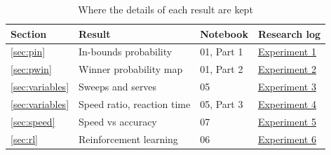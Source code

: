   \begin{table}[htbp]
    \centering
    \caption{Where the details of each result are kept}
    \label{tab:index}
    \begin{tabular}{llll}
      \toprule
      Section & Result & Notebook & Research log \\
      \midrule
      \ref{sec:pin} & In-bounds probability & 01, Part 1
        & \href{https://docs.google.com/document/d/19KGM-1a9U5E7CrE4ltljYz7IVtMfNuRzrqgGkkuXUSQ/edit?tab=t.0}{Experiment 1} \\
      \ref{sec:pwin} & Winner probability map & 01, Part 2
        & \href{https://docs.google.com/document/d/19KGM-1a9U5E7CrE4ltljYz7IVtMfNuRzrqgGkkuXUSQ/edit?tab=t.0}{Experiment 2} \\
      \ref{sec:variables} & Sweeps and serves & 05
        & \href{https://docs.google.com/document/d/19KGM-1a9U5E7CrE4ltljYz7IVtMfNuRzrqgGkkuXUSQ/edit?tab=t.0}{Experiment 3} \\
      \ref{sec:variables} & Speed ratio, reaction time & 05, Part 3
        & \href{https://docs.google.com/document/d/19KGM-1a9U5E7CrE4ltljYz7IVtMfNuRzrqgGkkuXUSQ/edit?tab=t.0\#heading=h.xvdn4n7zo860}{Experiment 4} \\
      \ref{sec:speed} & Speed vs accuracy & 07
        & \href{https://docs.google.com/document/d/19KGM-1a9U5E7CrE4ltljYz7IVtMfNuRzrqgGkkuXUSQ/edit?tab=t.0\#heading=h.qrto9so35bnx}{Experiment 5} \\
      \ref{sec:rl} & Reinforcement learning & 06
        & \href{https://docs.google.com/document/d/19KGM-1a9U5E7CrE4ltljYz7IVtMfNuRzrqgGkkuXUSQ/edit?tab=t.0\#heading=h.kntokyu5w697}{Experiment 6} \\
      \bottomrule
    \end{tabular}
  \end{table}

  
  

